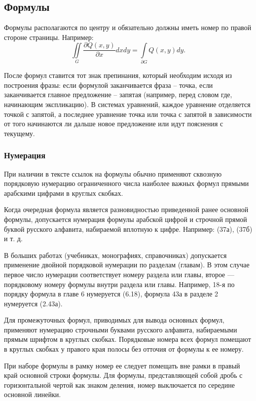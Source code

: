 \subsection{Формулы}
\par Формулы располагаются по центру и обязательно должны иметь номер по правой стороне страницы. Например: 
\begin{equation} 
    \iint\limits_{G} \frac{\partial Q(x,y)}{\partial x}dxdy = \int\limits_{\partial G} Q(x,y)dy.
\end{equation}  
\par После формул ставится тот знак препинания, который необходим исходя из построения фразы: если формулой заканчивается фраза -- точка, если заканчивается главное предложение -- запятая (например, перед сло­вом где, начинающим экспликацию). В системах уравнений, каждое уравнение отделяется точкой с запятой, а последнее уравнение точка или точка с запятой в зависимости от того начинаются ли дальше новое предложение или идут пояснения с текущему.
\subsubsection{Нумерация}
При наличии в тексте ссылок на формулы обычно применяют сквозную порядковую нумерацию ограниченного числа наиболее важных формул пря­мыми арабскими цифрами в круглых скобках.

Когда очередная формула является разновидностью приведенной ра­нее основной формулы, допускается нумерация формулы арабской цифрой и строчной прямой буквой русского алфавита, набираемой вплотную к цифре. Например: (37а), (37б) и т. д.

В больших работах (учебниках, монографиях, справочниках) допус­кается применение двойной порядковой нумерации по разделам (главам). В этом случае первое число нумерации соответствует номеру раздела или главы, второе — порядковому номеру формулы внутри раздела или главы. Напри­мер, 18-я по порядку формула в главе 6 нумеруется (6.18), формула 43а в раз­деле 2 нумеруется (2.43а).

Для промежуточных формул, приводимых для вывода основных фор­мул, применяют нумерацию строчными буквами русского алфавита, наби­раемыми прямым шрифтом в круглых скобках.
Порядковые номера всех формул помещают в круглых скобках у пра­вого края полосы без отточия от формулы к ее номеру.

При наборе формулы в рамку номер ее следует помещать вне рамки в правый край основной строки формулы.
Для формулы, представляющей собой дробь с горизонтальной чертой как знаком деления, номер выключается по середине основной ли­нейки.


